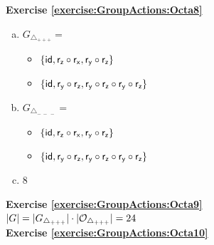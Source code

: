 \noindent\textbf{Exercise \ref{exercise:GroupActions:Octa8}}
\begin{enumerate}[(a)]
\item 
$G_{\triangle_{+ + +}} =$
	\begin{itemize}
	\item
	$\{\sf{id}, r_z \circ r_x, r_y \circ r_z\}$
	
	\item
	$\{\sf{id}, r_y \circ r_z, r_y \circ r_z \circ r_y \circ r_z\}$
	\end{itemize}
	
\item 
$G_{\triangle_{ -~-~-}} =$
	\begin{itemize}
	\item
	$\{\sf{id}, r_z \circ r_x, r_y \circ r_z\}$
	
	\item
	$\{\sf{id}, r_y \circ r_z, r_y \circ r_z \circ r_y \circ r_z\}$
	\end{itemize}
	
\item 
8
\end {enumerate}

\noindent\textbf{Exercise \ref{exercise:GroupActions:Octa9}}
\\
$|G| = |G_{\triangle_{+ + +}}| \cdot |{\cal O}_{\triangle_{+ + +}}| = 24$
\\


\noindent\textbf{Exercise \ref{exercise:GroupActions:Octa10}}
% 
%

